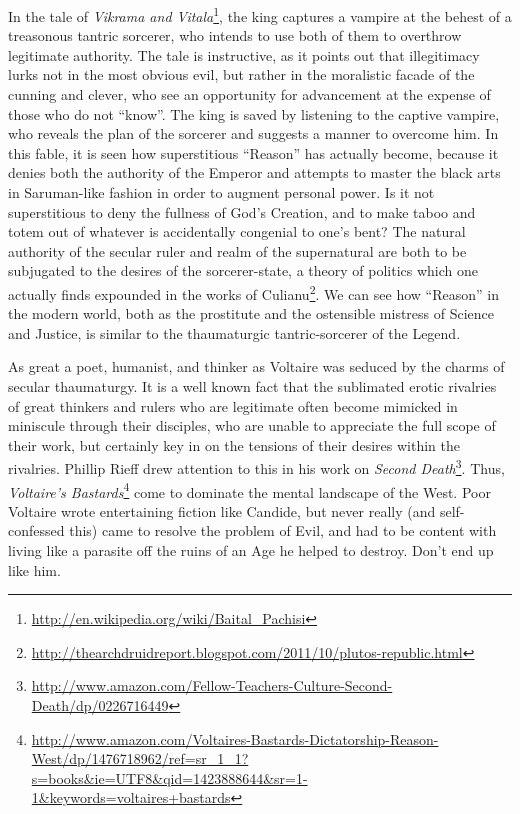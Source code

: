 In the tale of \textit{Vikrama and Vitala}\footnote{\url{http://en.wikipedia.org/wiki/Baital_Pachisi}}, the king captures a vampire at the behest of a treasonous tantric sorcerer, who intends to use both of them to overthrow legitimate authority. The tale is instructive, as it points out that illegitimacy lurks not in the most obvious evil, but rather in the moralistic facade of the cunning and clever, who see an opportunity for advancement at the expense of those who do not ``know''. The king is saved by listening to the captive vampire, who reveals the plan of the sorcerer and suggests a manner to overcome him. In this fable, it is seen how superstitious ``Reason'' has actually become, because it denies both the authority of the Emperor and attempts to master the black arts in Saruman-like fashion in order to augment personal power. Is it not superstitious to deny the fullness of God's Creation, and to make taboo and totem out of whatever is accidentally congenial to one's bent? The natural authority of the secular ruler and realm of the supernatural are both to be subjugated to the desires of the sorcerer-state, a theory of politics which one actually finds expounded in the works of Culianu\footnote{\url{http://thearchdruidreport.blogspot.com/2011/10/plutos-republic.html}}. We can see how ``Reason'' in the modern world, both as the prostitute and the ostensible mistress of Science and Justice, is similar to the thaumaturgic tantric-sorcerer of the Legend.

As great a poet, humanist, and thinker as Voltaire was seduced by the charms of secular thaumaturgy. It is a well known fact that the sublimated erotic rivalries of great thinkers and rulers who are legitimate often become mimicked in miniscule through their disciples, who are unable to appreciate the full scope of their work, but certainly key in on the tensions of their desires within the rivalries. Phillip Rieff drew attention to this in his work on \emph{Second Death}\footnote{\url{http://www.amazon.com/Fellow-Teachers-Culture-Second-Death/dp/0226716449}}. Thus, \emph{Voltaire's Bastards}\footnote{\url{http://www.amazon.com/Voltaires-Bastards-Dictatorship-Reason-West/dp/1476718962/ref=sr_1_1?s=books\&ie=UTF8\&qid=1423888644&sr=1-1&keywords=voltaires+bastards}} come to dominate the mental landscape of the West. Poor Voltaire wrote entertaining fiction like Candide, but never really (and self-confessed this) came to resolve the problem of Evil, and had to be content with living like a parasite off the ruins of an Age he helped to destroy. Don't end up like him.

